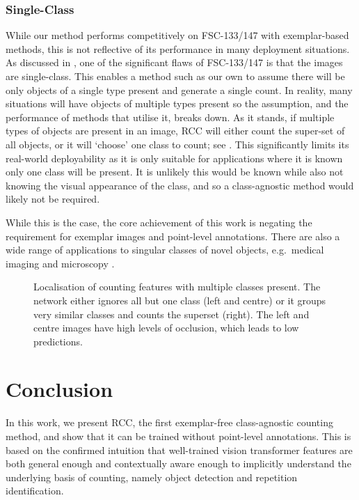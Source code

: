 \documentclass[../thesis.tex]{subfiles}
\begin{document}
\subsubsection{Single-Class}
While our method performs competitively on FSC-133/147 with exemplar-based methods, this is not reflective of its performance in many deployment situations.
As discussed in , one of the significant flaws of FSC-133/147 is that the images are single-class. This enables a method such as our own to assume there will be only objects of a single type present and generate a single count. 
In reality, many situations will have objects of multiple types present so the assumption, and the performance of methods that utilise it, breaks down.
As it stands, if multiple types of objects are present in an image, RCC will either count the super-set of all objects, or it will `choose' one class to count; see . This significantly limits its real-world deployability as it is only suitable for applications where it is known only one class will be present.
It is unlikely this would be known while also not knowing the visual appearance of the class, and so a class-agnostic method would likely not be required.

While this is the case, the core achievement of this work is negating the requirement for exemplar images and point-level annotations. There are also a wide range of applications to singular classes of novel objects, e.g.\ medical imaging and microscopy \cite{xie2018microscopy}.
\begin{figure}
    \centering
       
    \caption{Localisation of counting features with multiple classes present. 
    The network either ignores all but one class (left and centre) or it groups very similar classes and counts the superset (right). The left and centre images have high levels of occlusion, which leads to low predictions.
    }
    \label{fig__LTCA__figure_multiclass}
\end{figure}

\section{Conclusion}
\label{LTCA__sec__conclusion}
In this work, we present RCC, the first exemplar-free class-agnostic counting method,
and show that it can be trained without point-level annotations.
This is based on the confirmed intuition that well-trained vision transformer features are both general enough and contextually aware enough to implicitly understand the underlying basis of counting, namely object detection and repetition identification. 
\end{document}

